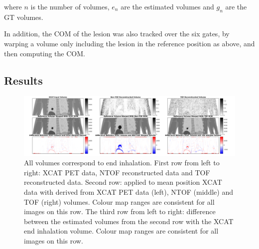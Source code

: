                 \noindent where $n$ is the number of volumes, $e_n$ are the estimated volumes and $g_n$ are the \gls{GT} volumes.
                
                In addition, the \gls{COM} of the lesion was also tracked over the six gates, by warping a volume only including the lesion in the reference position as above, and then computing the \gls{COM}.
            
        \subsection{Results} \label{sec:impact_of_tof_on_respiratory_motion_model_estimation_using_pre_gated_no_intra_cycle_motion_nac_pet_results}
            \begin{figure}
                \centering
                
                \includegraphics[width=1.0\linewidth]{figures/result_1_output.png}
                
                \captionsetup{singlelinecheck=false, justification=raggedright}
                \caption{All volumes correspond to end inhalation. First row from left to right: \gls{XCAT} \gls{PET} data,  \gls{NTOF} reconstructed data and  \gls{TOF} reconstructed data. Second row:  applied to mean position \gls{XCAT} data with  derived from \gls{XCAT} \gls{PET} data (left),  \gls{NTOF} (middle) and  \gls{TOF} (right) volumes. Colour map ranges are consistent for all images on this row. The third row from left to right:  difference between the estimated volumes from the second row with the \gls{XCAT} end inhalation volume. Colour map ranges are consistent for all images on this row.} \label{fig:impact_of_tof_on_respiratory_motion_model_estimation_using_pre_gated_no_intra_cycle_motion_nac_pet_results_output}
            \end{figure}
            
